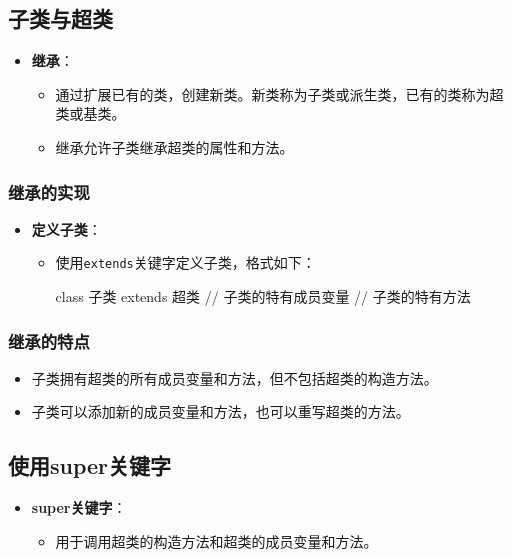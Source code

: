 \documentclass[a4paper, 10pt]{ctexart}
\begin{document}
\subsection{子类与超类}
\begin{itemize}
  \item \textbf{继承}：
  \begin{itemize}
    \item 通过扩展已有的类，创建新类。新类称为子类或派生类，已有的类称为超类或基类。
    \item 继承允许子类继承超类的属性和方法。
  \end{itemize}
\end{itemize}

\subsubsection{继承的实现}
\begin{itemize}
  \item \textbf{定义子类}：
  \begin{itemize}
    \item 使用\texttt{extends}关键字定义子类，格式如下：
    \begin{codeblock}
class 子类 extends 超类 {
    // 子类的特有成员变量
    // 子类的特有方法
}
    \end{codeblock}
  \end{itemize}
\end{itemize}

\subsubsection{继承的特点}
\begin{itemize}
  \item 子类拥有超类的所有成员变量和方法，但不包括超类的构造方法。
  \item 子类可以添加新的成员变量和方法，也可以重写超类的方法。
\end{itemize}

\subsection{使用super关键字}
\begin{itemize}
  \item \textbf{super关键字}：
  \begin{itemize}
    \item 用于调用超类的构造方法和超类的成员变量和方法。
  \end{itemize}
\end{itemize}
\end{document}
